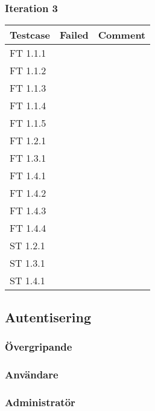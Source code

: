 \documentclass[a4paper]{article}
\begin{document}
\subsubsection{Iteration 3}
\begin{tabular}{| l | l | p{11cm} |}
\hline
Testcase &  Failed & Comment\\
\hline
FT 1.1.1 & & \\
\hline
FT 1.1.2 & & \\
\hline
FT 1.1.3 & & \\
\hline
FT 1.1.4 & & \\
\hline
FT 1.1.5 & & \\
\hline
FT 1.2.1 & & \\
\hline
FT 1.3.1 & & \\
\hline
FT 1.4.1 & & \\
\hline
FT 1.4.2 & & \\
\hline
FT 1.4.3 & & \\
\hline
FT 1.4.4 & & \\
\hline
ST 1.2.1 & & \\
\hline
ST 1.3.1 & & \\
\hline
ST 1.4.1 & & \\
\hline
\end{tabular}







\subsection{Autentisering}

\subsubsection{Övergripande}

\subsubsection{Användare}



\subsubsection{Administratör}
\end{document}

